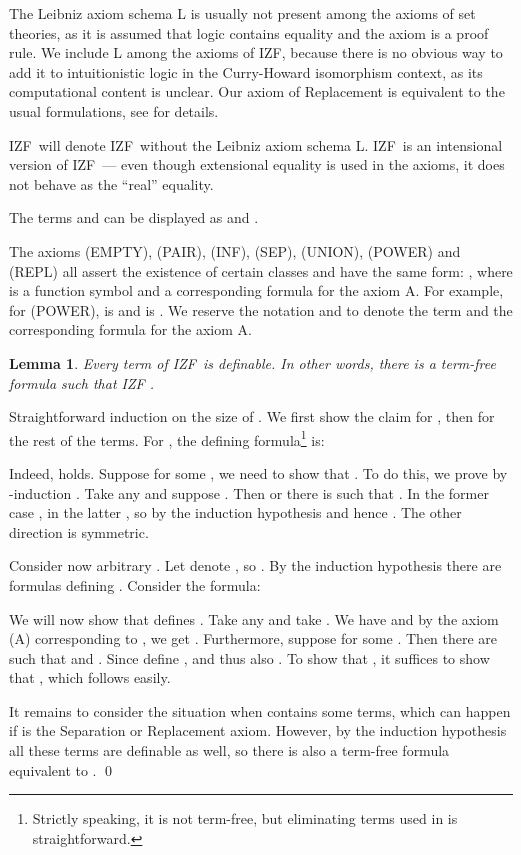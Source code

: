 \documentclass{LMCS}
\newtheorem{lemma}[thm]{Lemma}
\newcommand{\ignore}[1]{}
\newcommand{\izfr}{IZF}
\newcommand{\iizfr}{IZF}
\begin{document}
The Leibniz axiom schema L is usually not present among the axioms of set
theories, as it is assumed that logic contains equality and the axiom is 
a proof rule. We include L among the axioms of \izfr, because
there is no obvious way to add it to intuitionistic logic in the Curry-Howard isomorphism context,
as its computational content is unclear. Our axiom of Replacement is
equivalent to the usual formulations, see \cite{jatrinac2006} for details.

\iizfr\ will denote \izfr\  without the Leibniz axiom schema L. \iizfr\ is
an intensional version of \izfr\  --- even though extensional equality is used
in the axioms, it does not behave as the ``real'' equality. 

The terms  and  can be displayed
as  and .

The axioms (EMPTY), (PAIR), (INF), (SEP), (UNION), (POWER) and (REPL)
all assert the existence of certain classes and have the same form: , where  is a 
function symbol and  a corresponding formula
for the axiom A. For example, for (POWER),  is  and
 is . We reserve the notation  and  to denote the term and
the corresponding formula for the axiom A.

\begin{lemma}\label{tdef0}
Every term  of \izfr\ is definable. In
other words, there is a term-free formula  such that \izfr 
.
\end{lemma}
\proof Straightforward induction on the size of .
We first show the claim for , then for the rest of the terms. For , the defining
formula\footnote{Strictly speaking, it is not term-free, but eliminating
terms used in  is straightforward.} is:

Indeed,  holds. Suppose  for some
, we need to show that . To do this, we prove by
-induction . Take any  and 
suppose . Then  or there is  such that .
In the former case , in the latter , so by the
induction hypothesis  and hence . The other
direction is symmetric. 

Consider now arbitrary . Let
 denote , so .
By the induction hypothesis there are formulas  defining . Consider the formula:

We will now show that  defines . Take any  and take 
. We have
 and
by the axiom (A) corresponding to , we get . Furthermore, suppose  for
some . Then there are  such that  and . Since  define ,
 and thus also .
To show that , it suffices to show that , which follows easily.

It remains to consider the situation when  contains some terms,
which can happen if  is the Separation or Replacement axiom. However, by the 
induction hypothesis all these terms are definable as well, so there is also a term-free formula  equivalent to .
\ignore{

Let the formulas
 define .
defines . To see that  holds, take .
By the induction hypothesis we have  and 
by the axiom (A) defining , we get . Furthermore, suppose  for
some . Then there are  such that  and . Since  define ,
 and thus also . 
To show that , it suffices to show that , which follows easily.}\qed
\end{document}
